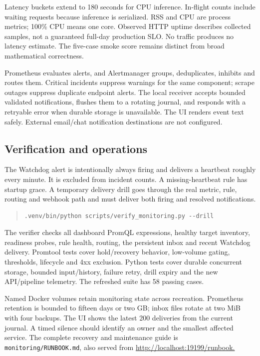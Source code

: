 \documentclass[11pt,a4paper]{article}
\begin{document}
Latency buckets extend to 180 seconds for CPU inference. In-flight counts include waiting requests because inference is serialized. RSS and CPU are process metrics; 100\% CPU means one core. Observed HTTP uptime describes collected samples, not a guaranteed full-day production SLO. No traffic produces no latency estimate. The five-case smoke score remains distinct from broad mathematical correctness.

Prometheus evaluates alerts, and Alertmanager groups, deduplicates, inhibits and routes them. Critical incidents suppress warnings for the same component; scrape outages suppress duplicate endpoint alerts. The local receiver accepts bounded validated notifications, flushes them to a rotating journal, and responds with a retryable error when durable storage is unavailable. The UI renders event text safely. External email/chat notification destinations are not configured.

\newpage
\subsection*{Verification and operations}
The Watchdog alert is intentionally always firing and delivers a heartbeat roughly every minute. It is excluded from incident counts. A missing-heartbeat rule has startup grace. A temporary delivery drill goes through the real metric, rule, routing and webhook path and must deliver both firing and resolved notifications.

\begin{quote}\small
\begin{verbatim}
.venv/bin/python scripts/verify_monitoring.py --drill
\end{verbatim}
\end{quote}
The verifier checks all dashboard PromQL expressions, healthy target inventory, readiness probes, rule health, routing, the persistent inbox and recent Watchdog delivery. Promtool tests cover hold/recovery behavior, low-volume gating, thresholds, lifecycle and 4xx exclusion. Python tests cover durable concurrent storage, bounded input/history, failure retry, drill expiry and the new API/pipeline telemetry. The refreshed suite has 58 passing cases.

Named Docker volumes retain monitoring state across recreation. Prometheus retention is bounded to fifteen days or two GB; inbox files rotate at two MiB with four backups. The UI shows the latest 200 deliveries from the current journal. A timed silence should identify an owner and the smallest affected service. The complete recovery and maintenance guide is \texttt{monitoring/\allowbreak{}RUNBOOK.\allowbreak{}md}, also served from \url{http://localhost:19199/runbook.}
\end{document}
